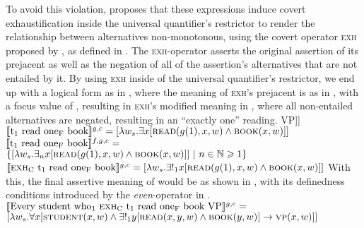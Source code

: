 To avoid this violation, \textcite{Crnic2014-dogma} proposes that these expressions induce covert exhaustification inside the universal quantifier's restrictor to render the relationship between alternatives non-monotonous, using the covert operator {\scshape exh} proposed by \textcite{Chierchia2012}, as defined in .
\ex{}\xe
The {\scshape exh}-operator asserts the original assertion of its prejacent as well as the negation of all of the assertion's alternatives that are not entailed by it. By using {\scshape exh} inside of the universal quantifier's restrictor, we end up with a logical form as in , where the meaning of {\scshape exh}'s prejacent is as in , with a focus value of , resulting in {\scshape exh}'s modified meaning in , where all non-entailed alternatives are negated, resulting in an \enquote{exactly one} reading.
\pex[nopreamble=true]%
\a[]\phantomsection [even\textsubscript{C'} [every student wh\textsubscript{1} [{\scshape exh}\textsubscript{C} t\textsubscript{1} read one\textsubscript{F} book] VP]]
\a{} $\intension[g,c]{t\textsubscript{1} read one\textsubscript{F} book}=[\lambda{w_s}.\exists{x}[\predicate{read}(g(1),x,w)\land\predicate{book}(x,w)]]$
\a{} $\intension[f,g,c]{t\textsubscript{1} read one\textsubscript{F} book}=$\\\emptyfill$\{[\lambda{w_s}.\exists_n{x}[\predicate{read}(g(1),x,w)\land\predicate{book}(x,w)]]~|~n\in\mathbb{N}\geqslant1\}$
\a{} $\intension[g,c]{{\scshape exh}\textsubscript{C} t\textsubscript{1} read one\textsubscript{F} book}=[\lambda{w_s}.\exists!_1{x}[\predicate{read}(g(1),x,w)\land\predicate{book}(x,w)]]$
\xe
With this, the final assertive meaning of  would be as shown in , with its definedness conditions introduced by the \textit{even}-operator in .
\ex{}
$\intension[g,c]{Every student who\textsubscript{1} {\scshape exh}\textsubscript{C} t\textsubscript{1} read one\textsubscript{F} book VP}=$\\\emptyfill$[\lambda{w_s}.\forall{x}[\predicate{student}(x,w)\land\exists!_1{y}[\predicate{read}(x,y,w)\land\predicate{book}(y,w)]\rightarrow\predicate{vp}(x,w)]]$
